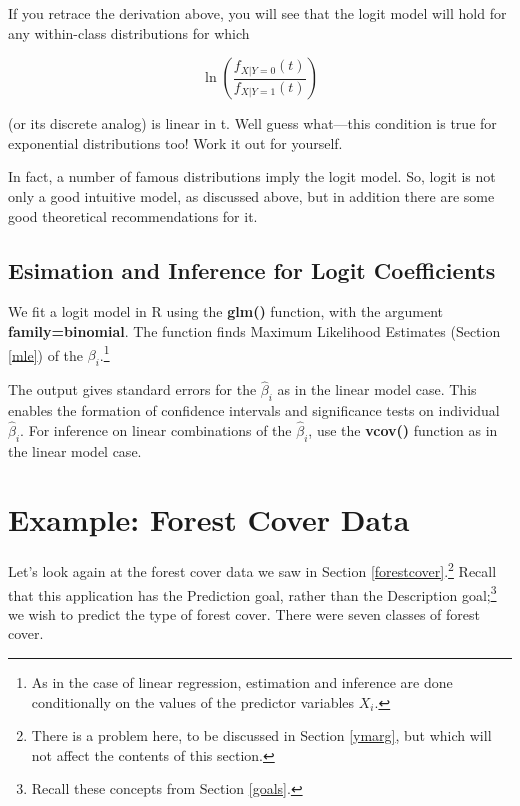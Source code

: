 If you retrace the derivation above, you will see that the logit model
will hold for any within-class distributions for which 

\begin{equation}
\label{logitlogodds}
\ln \left ( \frac{f_{X|Y=0}(t)}{f_{X|Y=1}(t)} \right )
\end{equation}

(or its discrete analog) is linear in t.  Well guess what---this
condition is true for exponential distributions too!  Work it out for
yourself.


In fact, a number of famous distributions imply the logit model.  So,
logit is not only a good intuitive model, as discussed above, but in
addition there are some good theoretical recommendations for it.

\subsection{Esimation and Inference for Logit Coefficients}

We fit a logit model in R using the {\bf glm()} function, with the
argument {\bf family=binomial}.  The function finds Maximum Likelihood
Estimates (Section \ref{mle}) of the $\beta_i$.\footnote{As in the case
of linear regression, estimation and inference are done conditionally on
the values of the predictor variables $X_i$.} 

The output gives standard errors for the $\widehat{\beta}_i$ as in the
linear model case.  This enables the formation of confidence intervals
and significance tests on individual $\widehat{\beta}_i$.  For inference
on linear combinations of the $\widehat{\beta}_i$, use the {\bf vcov()}
function as in the linear model case.

\section{Example:  Forest Cover Data}
\label{forest}

Let's look again at the forest cover data we saw in Section
\ref{forestcover}.\footnote{There is a problem here, to be discussed in
Section \ref{ymarg}, but which will not affect the contents of this
section.} Recall that this application has the Prediction goal, rather
than the Description goal;\footnote{Recall these concepts from Section
\ref{goals}.} we wish to predict the type of forest cover.  There were
seven classes of forest cover.  

